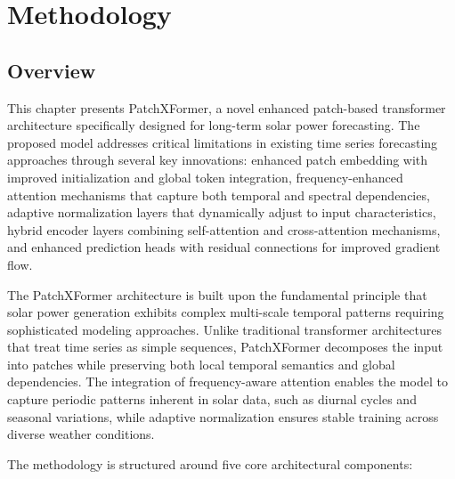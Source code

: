 \documentclass[12pt]{uomthesis}
\begin{document}
\chapter{Methodology}
\label{ch:proposed:method}

\section{Overview}

This chapter presents PatchXFormer, a novel enhanced patch-based transformer architecture specifically designed for long-term solar power forecasting. The proposed model addresses critical limitations in existing time series forecasting approaches through several key innovations: enhanced patch embedding with improved initialization and global token integration, frequency-enhanced attention mechanisms that capture both temporal and spectral dependencies, adaptive normalization layers that dynamically adjust to input characteristics, hybrid encoder layers combining self-attention and cross-attention mechanisms, and enhanced prediction heads with residual connections for improved gradient flow.

The PatchXFormer architecture is built upon the fundamental principle that solar power generation exhibits complex multi-scale temporal patterns requiring sophisticated modeling approaches. Unlike traditional transformer architectures that treat time series as simple sequences, PatchXFormer decomposes the input into patches while preserving both local temporal semantics and global dependencies. The integration of frequency-aware attention enables the model to capture periodic patterns inherent in solar data, such as diurnal cycles and seasonal variations, while adaptive normalization ensures stable training across diverse weather conditions.

The methodology is structured around five core architectural components:
\end{document}
